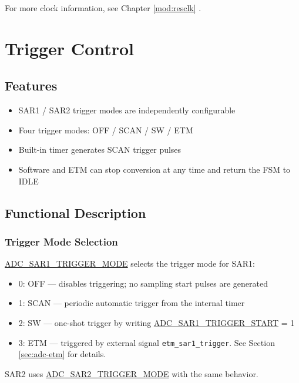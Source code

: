 \documentclass[main\_\_EN.tex]{subfiles}
\begin{document}
For more clock information, see Chapter \ref{mod:resclk} \textit{}.

\section{Trigger Control}
\label{sec:adc-trigger}

\subsection{Features}
\begin{itemize}
    \item SAR1 / SAR2 trigger modes are independently configurable
    \item Four trigger modes: OFF / SCAN / SW / ETM
    \item Built-in timer generates SCAN trigger pulses
    \item Software and ETM can stop conversion at any time and return the FSM to IDLE
\end{itemize}

\subsection{Functional Description}
\label{sec:adc-trigger-func-descr}

\subsubsection{Trigger Mode Selection}
\hyperref[fielddesc:ADCSAR1TRIGGERMODE]{ADC\_SAR1\_TRIGGER\_MODE} selects the trigger mode for SAR1:
\begin{itemize}
    \item 0: OFF --- disables triggering; no sampling start pulses are generated
    \item 1: SCAN --- periodic automatic trigger from the internal timer
    \item 2: SW --- one-shot trigger by writing \hyperref[fielddesc:ADCSAR1TRIGGERSTART]{ADC\_SAR1\_TRIGGER\_START} = 1 
    \item 3: ETM --- triggered by external signal \verb+etm_sar1_trigger+. See Section \ref{sec:adc-etm} \textit{} for details.
\end{itemize}
SAR2 uses \hyperref[fielddesc:ADCSAR2TRIGGERMODE]{ADC\_SAR2\_TRIGGER\_MODE} with the same behavior.
\end{document}
